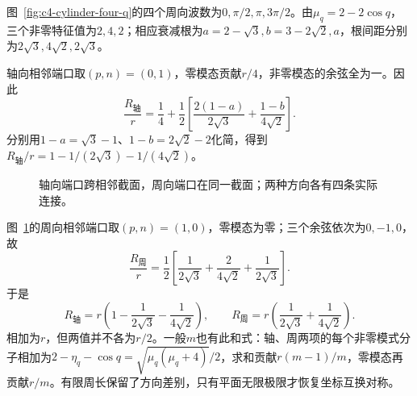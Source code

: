 \begin{solution}
图~\ref{fig:c4-cylinder-four-q}的四个周向波数为$0,\pi/2,\pi,3\pi/2$。由$\mu_q=2-2\cos q$，三个非零特征值为$2,4,2$；相应衰减根为$a=2-\sqrt3,b=3-2\sqrt2,a$，根间距分别为$2\sqrt3,4\sqrt2,2\sqrt3$。

轴向相邻端口取$(p,n)=(0,1)$，零模态贡献$r/4$，非零模态的余弦全为一。因此
\[
 \frac{R_{\text{轴}}}r=\frac14+
 \frac12\left[\frac{2(1-a)}{2\sqrt3}+\frac{1-b}{4\sqrt2}\right].
\]
分别用$1-a=\sqrt3-1$、$1-b=2\sqrt2-2$化简，得到$R_{\text{轴}}/r=1-1/(2\sqrt3)-1/(4\sqrt2)$。
\begin{figure}[H]\centering
{}
\caption{轴向端口跨相邻截面，周向端口在同一截面；两种方向各有四条实际连接。}\label{fig:c4-cylinder-four-s}
\end{figure}
图~\ref{fig:c4-cylinder-four-s}的周向相邻端口取$(p,n)=(1,0)$，零模态为零；三个余弦依次为$0,-1,0$，故
\[
 \frac{R_{\text{周}}}r=\frac12
 \left[\frac1{2\sqrt3}+\frac2{4\sqrt2}+\frac1{2\sqrt3}\right].
\]
于是
\[
 \boxed{R_{\text{轴}}=r\left(1-\frac1{2\sqrt3}-\frac1{4\sqrt2}\right)},
 \qquad\boxed{R_{\text{周}}=r\left(\frac1{2\sqrt3}+\frac1{4\sqrt2}\right)}.
\]
相加为$r$，但两值并不各为$r/2$。一般$m$也有此和式：轴、周两项的每个非零模式分子相加为$2-\eta_q-\cos q=\sqrt{\mu_q(\mu_q+4)}/2$，求和贡献$r(m-1)/m$，零模态再贡献$r/m$。有限周长保留了方向差别，只有平面无限极限才恢复坐标互换对称。
\end{solution}



